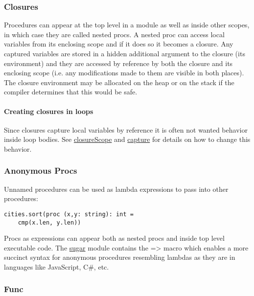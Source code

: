 \hypertarget{closures}{%
\subsubsection{Closures}\label{closures}}

Procedures can appear at the top level in a module as well as inside
other scopes, in which case they are called nested procs. A nested proc
can access local variables from its enclosing scope and if it does so it
becomes a closure. Any captured variables are stored in a hidden
additional argument to the closure (its environment) and they are
accessed by reference by both the closure and its enclosing scope (i.e.
any modifications made to them are visible in both places). The closure
environment may be allocated on the heap or on the stack if the compiler
determines that this would be safe.

\hypertarget{creating-closures-in-loops}{%
\paragraph{Creating closures in
loops}\label{creating-closures-in-loops}}

Since closures capture local variables by reference it is often not
wanted behavior inside loop bodies. See
\href{system.html\#closureScope.t,untyped}{closureScope} and
\href{sugar.html\#capture.m,openArray\%5Btyped\%5D,untyped}{capture} for
details on how to change this behavior.

\hypertarget{anonymous-procs}{%
\subsubsection{Anonymous Procs}\label{anonymous-procs}}

Unnamed procedures can be used as lambda expressions to pass into other
procedures:

\begin{verbatim}
cities.sort(proc (x,y: string): int =
    cmp(x.len, y.len))
\end{verbatim}

Procs as expressions can appear both as nested procs and inside top
level executable code. The \href{sugar.html}{sugar} module contains the
{=\textgreater{}} macro which enables a more succinct syntax for
anonymous procedures resembling lambdas as they are in languages like
JavaScript, C\#, etc.

\hypertarget{func}{%
\subsubsection{Func}\label{func}}

